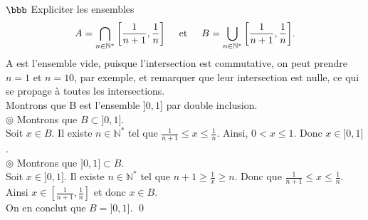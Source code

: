 \documentclass[11pt]{article}
\begin{document}
\pagebreak

\begin{exercice}{$\bbb$}{}
    Expliciter les ensembles
    \begin{equation*}
        A = \bigcap_{n\in\mathbb{N}^*}{\left\lbrack{\frac{1}{n+1},\frac{1}{n}}\right\rbrack} \hspace{0.5cm} \text{et} \hspace{0.5cm} B =\bigcup_{n\in\mathbb{N}^*}{\left\lbrack{\frac{1}{n+1}, \frac{1}{n}}\right\rbrack}.
    \end{equation*}
    \tcblower
    A est l'ensemble vide, puisque l'intersection est commutative, on peut prendre $n=1$ et $n=10$, par exemple, et remarquer que leur intersection est nulle, ce qui se propage à toutes les intersections.\\[0.25cm]
    Montrons que B est l'ensemble $\rbrack0,1\rbrack$ par double inclusion.\\
    $\circledcirc$ Montrons que $B \subset \rbrack0,1\rbrack$.\\
    Soit $x \in B$. Il existe $n\in\mathbb{N}^*$ tel que $\frac{1}{n+1}\leq x \leq \frac{1}{n}$. Ainsi, $0 < x \leq 1$. Donc $x\in\rbrack0,1\rbrack$.\\
    $\circledcirc$ Montrons que $\rbrack0,1\rbrack \subset B$.\\
    Soit $x \in \rbrack 0,1 \rbrack$. Il existe $n\in\mathbb{N}^*$ tel que $n+1 \geq \frac{1}{x} \geq n$. Donc que $\frac{1}{n+1} \leq x \leq \frac{1}{n}$.\\
    Ainsi $x \in \left\lbrack\frac{1}{n+1},\frac{1}{n}\right\rbrack$ et donc $x \in B$.\\
    On en conclut que $B=\rbrack0,1\rbrack$. \qed
\end{exercice}
\end{document}
